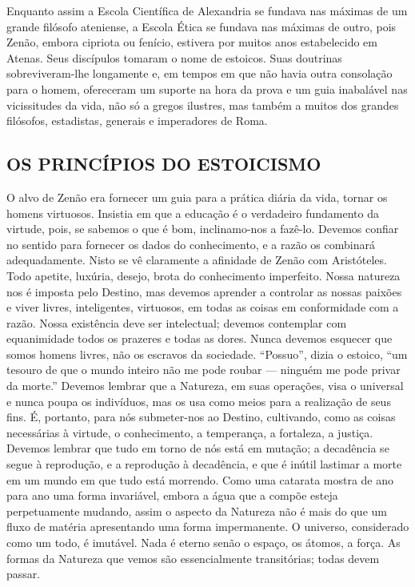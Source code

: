 \documentclass[11pt,a5paper,twoside,openany]{book}
\begin{document}
Enquanto assim a Escola Científica de Alexandria se fundava nas máximas de um grande filósofo ateniense, a Escola Ética se fundava nas máximas de outro, pois Zenão, embora cipriota ou fenício, estivera por muitos anos estabelecido em Atenas. Seus discípulos tomaram o nome de estoicos. Suas doutrinas sobreviveram-lhe longamente e, em tempos em que não havia outra consolação para o homem, ofereceram um suporte na hora da prova e um guia inabalável nas vicissitudes da vida, não só a gregos ilustres, mas também a muitos dos grandes filósofos, estadistas, generais e imperadores de Roma.

\subsection*{OS PRINCÍPIOS DO ESTOICISMO}
O alvo de Zenão era fornecer um guia para a prática diária da vida, tornar os homens virtuosos. Insistia em que a educação é o verdadeiro fundamento da virtude, pois, se sabemos o que é bom, inclinamo-nos a fazê-lo. Devemos confiar no sentido para fornecer os dados do conhecimento, e a razão os combinará adequadamente. Nisto se vê claramente a afinidade de Zenão com Aristóteles. Todo apetite, luxúria, desejo, brota do conhecimento imperfeito. Nossa natureza nos é imposta pelo Destino, mas devemos aprender a controlar as nossas paixões e viver livres, inteligentes, virtuosos, em todas as coisas em conformidade com a razão. Nossa existência deve ser intelectual; devemos contemplar com equanimidade todos os prazeres e todas as dores. Nunca devemos esquecer que somos homens livres, não os escravos da sociedade. “Possuo”, dizia o estoico, “um tesouro de que o mundo inteiro não me pode roubar — ninguém me pode privar da morte.” Devemos lembrar que a Natureza, em suas operações, visa o universal e nunca poupa os indivíduos, mas os usa como meios para a realização de seus fins. É, portanto, para nós submeter-nos ao Destino, cultivando, como as coisas necessárias à virtude, o conhecimento, a temperança, a fortaleza, a justiça. Devemos lembrar que tudo em torno de nós está em mutação; a decadência se segue à reprodução, e a reprodução à decadência, e que é inútil lastimar a morte em um mundo em que tudo está morrendo. Como uma catarata mostra de ano para ano uma forma invariável, embora a água que a compõe esteja perpetuamente mudando, assim o aspecto da Natureza não é mais do que um fluxo de matéria apresentando uma forma impermanente. O universo, considerado como um todo, é imutável. Nada é eterno senão o espaço, os átomos, a força. As formas da Natureza que vemos são essencialmente transitórias; todas devem passar.
\end{document}
